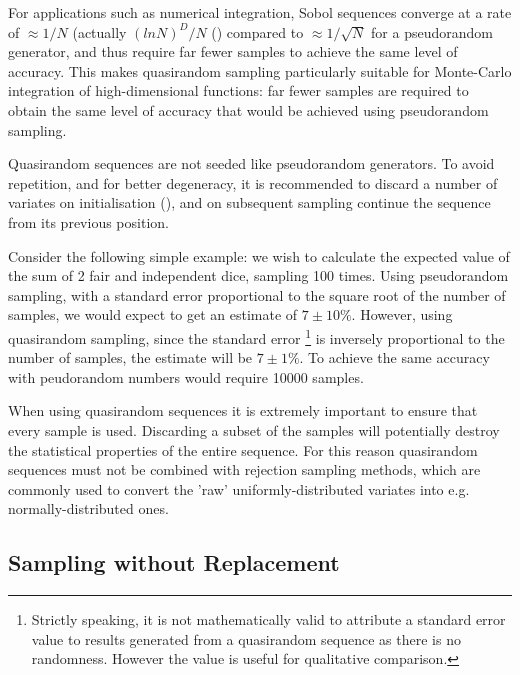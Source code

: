 \documentclass{JASSS}
\begin{document}
For applications such as numerical integration, Sobol sequences converge
at a rate of \(\approx1/N\) (actually \((ln N)^D/N\) (\cite{press_numerical_nodate})
compared to \(\approx1/\sqrt N\) for a pseudorandom generator, and thus
require far fewer samples to achieve the same level of accuracy. This makes quasirandom sampling particularly suitable for Monte-Carlo integration of high-dimensional functions: far fewer samples are required to obtain the same level of accuracy that would be achieved using pseudorandom sampling. 

Quasirandom sequences are not seeded like pseudorandom generators. To
avoid repetition, and for better degeneracy, it is recommended to
discard a number of variates on initialisation (\cite{joe_remark_2003}), and
on subsequent sampling continue the sequence from its previous position.

Consider the following simple example: we wish to calculate the expected value of the sum of 2 fair and independent dice, sampling 100 times. Using pseudorandom sampling, with a standard error proportional to the square root of the number of samples, we would expect to get an estimate of \(7 \pm 10\%\). However, using quasirandom sampling, since the standard error
\footnote{Strictly speaking, it is not mathematically valid to attribute a standard error value to results generated from a quasirandom sequence as there is no randomness. However the value is useful for qualitative comparison.} 
  is inversely proportional to the number of samples, the estimate will be \(7 \pm 1\%\). To achieve the same accuracy with peudorandom numbers would require 10000 samples.

When using quasirandom sequences it is extremely important to ensure that every sample is used. Discarding a subset of the samples will potentially destroy the statistical properties of the entire sequence. For this reason quasirandom sequences must not be combined with rejection sampling methods, which are commonly used to convert the 'raw' uniformly-distributed variates into e.g. normally-distributed ones.


\subsection{Sampling without Replacement}\label{sampling-without-replacement}
\end{document}
